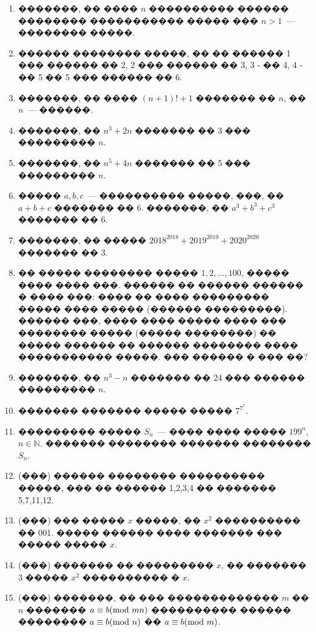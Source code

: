 \documentclass[a4paper,12pt]{article}
\begin{document}
\begin{enumerate}
\item �������, �� ���� $n$ ���������� ������ �������� ����������� ����� ��� $n>1$~--- �������� �����.

\item ������ �������� �����, �� �� ������ 1 ��� ������ �� 2, 2 ��� ������ �� 3, 3 - �� 4, 4 - �� 5 �� 5 ��� ������ �� 6.

\item �������, �� ���� $(n+1)!+1$ ������� �� $n$, �� $n$~--- ������.

\item �������, �� $n^{3}+2n$ ������� �� 3 ��� ��������� $n$.

\item �������, �� $n^{5}+4n$ ������� �� 5 ��� ��������� $n$.

\item ����� $a,b,c$~--- ���������� �����, ���, �� $a+b+c$ ������� �� 6. �������, �� $a^{3}+b^{3}+c^{3}$ ������� �� 6.

\item �������, �� ����� $2018^{2018}+2019^{2019}+2020^{2020}$ ������� �� 3.

\item �� ����� �������� ����� $1,2,...,100$, ����� ���� ���� ���. ������ �� ������ ������ � ���� ���: ���� �� ���� ��������� ����� ���� ����� (������ ���������). ������ ���, ���� ���� ����� ���� ��� �������� ����� (����� ��������) �� ����� ������ �� ������ �������� ���� ����������� �����. ��� ������ � ��� ��?

\item �������, �� $n^{3}-n$ ������� �� 24 ��� ������ ��������� $n$.

\item ������� ������� ����� ����� $7^{7^{7}}$.

\item ��������� ����� $S_{n}$~--- ���� ���� ����� $199^{n}$, $n\in \mathbb{N}$. ������� �������� ������� �������� $S_{n}$.

\item (���) ������ �������� ���������� �����, ��� �� ������ 1,2,3,4 �� ������� 5,7,11,12.

\item (���) ��� ����� $x$ �����, �� $x^{2}$ ���������� �� 001. ����� ������ ���� ������� ��� ����� ����� $x$.

\item (���) ������� �� ��������� $x$, �� ������� 3 ����� $x^{2}$ ���������� � $x$.

\item (���) �������, �� ��� ������������� $m$ �� $n$ ������� $a\equiv b(\textmd{mod }mn)$ ���������� ������ �������� $a\equiv b(\textmd{mod }n)$ �� $a\equiv b(\textmd{mod }m)$.
\end{enumerate}
\end{document}
